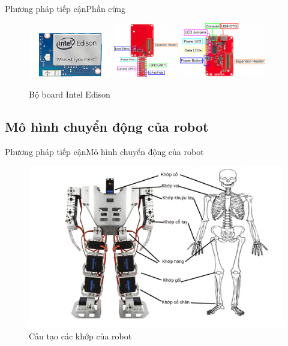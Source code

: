 \documentclass[compress, blue, 13pt,hyperref={pdfpagemode=FullScreen}]{beamer}
\begin{document}
\begin{frame}{Phương pháp tiếp cận}{Phần cứng}
\begin{figure}[hbtp]
\centering
\includegraphics[height = 2cm]{images/MakerBoards-Edison.jpg}
\includegraphics[height = 2.4cm]{images/GPIOBlockAnnotated.png}
\includegraphics[height = 2.4cm]{images/BaseAnnotated.png}
\caption{Bộ board Intel Edison}
\end{figure}
\end{frame}
\subsection{Mô hình chuyển động của robot}
\begin{frame}{Phương pháp tiếp cận}{Mô hình chuyển động của robot}
\begin{figure}[hbtp]
\centering
\includegraphics[scale=0.22]{images/ThietkeRobot.png}
\caption{Cấu tạo các khớp của robot}
\end{figure}
\end{frame}
\end{document}
